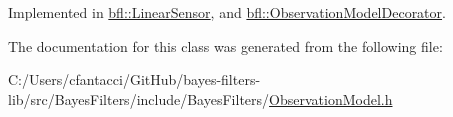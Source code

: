 Implemented in \mbox{\hyperlink{classbfl_1_1LinearSensor_a3d20baf95d4ea62c536c87e68238852f}{bfl\+::\+Linear\+Sensor}}, and \mbox{\hyperlink{classbfl_1_1ObservationModelDecorator_a0d6ab787754a56159e3d1bc6d56a961c}{bfl\+::\+Observation\+Model\+Decorator}}.



The documentation for this class was generated from the following file\+:\begin{DoxyCompactItemize}
\item 
C\+:/\+Users/cfantacci/\+Git\+Hub/bayes-\/filters-\/lib/src/\+Bayes\+Filters/include/\+Bayes\+Filters/\mbox{\hyperlink{ObservationModel_8h}{Observation\+Model.\+h}}\end{DoxyCompactItemize}

